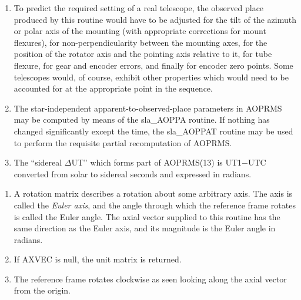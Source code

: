 {\begin{enumerate}
        perfect theodolite located at the observer.  This is obtained
        from the geocentric apparent \radec\ by allowing for Earth
        orientation and diurnal aberration, rotating from equator
        to horizon coordinates, and then adjusting for refraction.
        The \hadec\ is obtained by rotating back into equatorial
        coordinates, using the geodetic latitude corrected for polar
        motion, and is the position that would be seen by a perfect
        equatorial located at the observer and with its polar axis
        aligned to the Earth's axis of rotation ({\it n.b.}\ not to the
        refracted pole).  Finally, the $\alpha$ is obtained by subtracting
        the {\it h}\, from the local apparent ST.
  \item To predict the required setting of a real telescope, the
        observed place produced by this routine would have to be
        adjusted for the tilt of the azimuth or polar axis of the
        mounting (with appropriate corrections for mount flexures),
        for non-perpendicularity between the mounting axes, for the
        position of the rotator axis and the pointing axis relative
        to it, for tube flexure, for gear and encoder errors, and
        finally for encoder zero points.  Some telescopes would, of
        course, exhibit other properties which would need to be
        accounted for at the appropriate point in the sequence.
  \item The star-independent apparent-to-observed-place parameters
        in AOPRMS may be computed by means of the sla\_AOPPA routine.
        If nothing has changed significantly except the time, the
        sla\_AOPPAT routine may be used to perform the requisite
        partial recomputation of AOPRMS.
  \item The  ``sidereal $\Delta$UT'' which forms part of AOPRMS(13)
        is UT1$-$UTC converted from solar to
        sidereal seconds and expressed in radians.

 \end{enumerate}
}
{
}
{
}
{
}
\notes
{
 \begin{enumerate}
  \item A rotation matrix describes a rotation about some arbitrary axis.
        The axis is called the {\it Euler axis}, and the angle through which the
        reference frame rotates is called the Euler angle.  The axial
        vector supplied to this routine has the same direction as the
        Euler axis, and its magnitude is the Euler angle in radians.
  \item If AXVEC is null, the unit matrix is returned.
  \item The reference frame rotates clockwise as seen looking along
        the axial vector from the origin.
 \end{enumerate}
}
